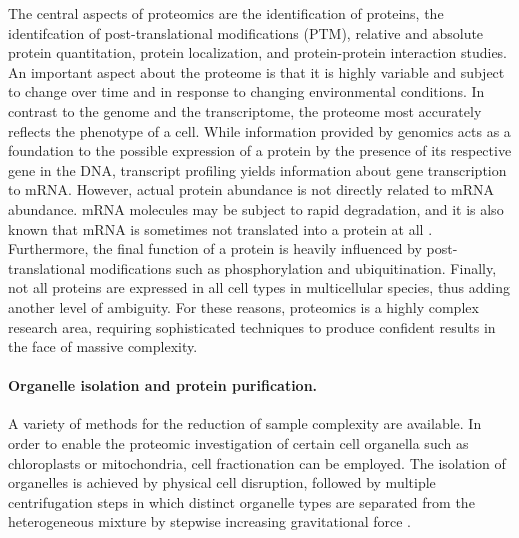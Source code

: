 The central aspects of proteomics are the identification of proteins, 
the identifcation of post-translational modifications (PTM), 
relative and absolute protein quantitation, protein localization, and
protein-protein interaction studies.
An important aspect about the proteome is that it is highly variable and
subject to change over time and in response to changing environmental conditions.
In contrast to the genome and the transcriptome, the proteome most accurately
reflects the phenotype of a cell.
While information provided by genomics acts as a foundation to the possible
expression of a protein by the presence of its respective gene in the DNA,
transcript profiling yields information about gene transcription to mRNA.
However, actual protein abundance is not directly related to mRNA abundance.
mRNA molecules may be subject to rapid degradation, and it is also known that 
mRNA is sometimes not translated into a protein at all \citep{Eddy2001}.
Furthermore, the final function of a protein is heavily influenced by
post-translational modifications such as phosphorylation \citep{Olsen2006} 
and ubiquitination.
Finally, not all proteins are expressed in all cell types in multicellular 
species, thus adding another level of ambiguity.
For these reasons, proteomics is a highly complex research area, requiring
sophisticated techniques to produce confident results in the face of
massive complexity.

\paragraph{Organelle isolation and protein purification.}

A variety of methods for the reduction of sample complexity are available.
% 
% 
In order to enable the proteomic investigation of certain cell organella such 
as chloroplasts or mitochondria, cell fractionation can be employed.
The isolation of organelles is achieved by physical cell disruption, followed
by multiple centrifugation steps in which distinct organelle types are 
separated from the heterogeneous mixture by stepwise increasing gravitational 
force \citep{Pertoft1978}.
% 
% 

